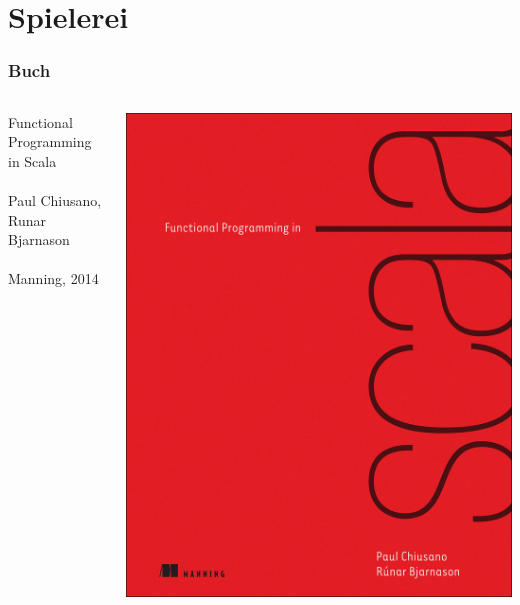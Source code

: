 	\section[Section]{Spielerei}
		\begin{frame}[fragile]
		\frametitle{Buch}
	    
\begin{columns}[c]
  \begin{column}{0.55\textwidth}
    Functional Programming in Scala\\
    \leavevmode \\
    Paul Chiusano,
    Runar Bjarnason\\
    \leavevmode \\
    Manning, 2014
  \end{column}
  \begin{column}[T]{0.55\textwidth}
    \includegraphics[scale=0.06]{book2.jpg}
  \end{column}
\end{columns}
		
		
\end{frame}
		
			